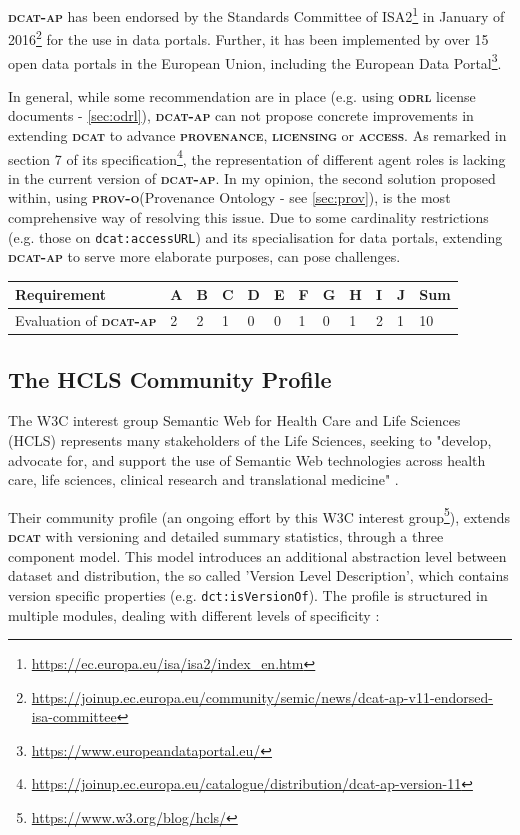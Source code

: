 \documentclass[a4paper,english,twoside,BCOR1.5cm,headsepline,DIV12,appendixprefix,final,12pt]{scrbook}
\newcommand{\provenance}{{\ttfamily\scshape\bfseries provenance}\xspace}
\newcommand{\licensing}{{\ttfamily\scshape\bfseries licensing}\xspace}
\newcommand{\access}{{\ttfamily\scshape\bfseries access}\xspace}
\newcommand{\odrl}{{\scshape\bfseries odrl}\xspace}
\newcommand{\prov}{{\scshape\bfseries prov-o}\xspace}
\newcommand{\dcat}{{\scshape\bfseries dcat}\xspace}
\newcommand{\dcatap}{{\scshape\bfseries dcat-ap}\xspace}
\newcommand{\prop}[1]{{{\texttt{#1}}}}
\newcommand\footnoteurl[1]{\footnote{\scriptsize\url{#1}}}
\begin{document}
\dcatap has been endorsed by the Standards Committee of ISA2\footnoteurl{https://ec.europa.eu/isa/isa2/index_en.htm} in January of 2016\footnoteurl{https://joinup.ec.europa.eu/community/semic/news/dcat-ap-v11-endorsed-isa-committee} for the use in data portals. Further, it has been implemented by over 15 open data portals in the European Union, including the European Data Portal\footnoteurl{https://www.europeandataportal.eu/}. 

In general, while some recommendation are in place (e.g. using \odrl license documents - \cref{sec:odrl}), \dcatap can not propose concrete improvements in extending \dcat to advance \provenance, \licensing or \access. As remarked in section 7 of its specification\footnoteurl{https://joinup.ec.europa.eu/catalogue/distribution/dcat-ap-version-11}, the representation of different agent roles is lacking in the current version of \dcatap. In my opinion, the second solution proposed within, using \prov (Provenance Ontology - see \cref{sec:prov}), is the most comprehensive way of resolving this issue. Due to some cardinality restrictions (e.g. those on \prop{dcat:accessURL}) and its specialisation for data portals, extending \dcatap to serve more elaborate purposes, can pose challenges. 

\begin{table}[!htbp]
    \centering
    \begin{tabular}{|l|l|l|l|l|l|l|l|l|l|l|l|}
        \hline
        Requirement & A & B & C & D & E & F & G & H & I & J & Sum \\
        \hline
        Evaluation of \dcatap & 2 & 2 & 1 & 0 & 0 & 1 & 0 & 1 & 2 & 1 & 10 \\
        \hline
    \end{tabular}
    \label{tab:evaldcatap}
\end{table}

\subsection{The HCLS Community Profile}
\label{sec:hcls}
The W3C interest group Semantic Web for Health Care and Life Sciences (HCLS)  represents many stakeholders of the Life Sciences, seeking to "develop, advocate for, and support the use of Semantic Web technologies across health care, life sciences, clinical research and translational medicine" \cite{hclsig}. 

Their community profile (an ongoing effort by this W3C interest group\footnoteurl{https://www.w3.org/blog/hcls/}), extends \dcat with versioning and detailed summary statistics, through a three component model. This model introduces an additional abstraction level between dataset and distribution, the so called 'Version Level Description', which contains version specific properties (e.g. \prop{dct:isVersionOf}). The profile is structured in multiple modules, dealing with different levels of specificity \cite{HCLSCP2016}:
\end{document}
